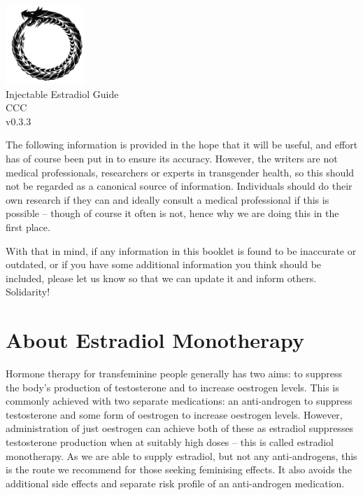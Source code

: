 \documentclass[twoside,a5paper]{article}
\begin{document}
\begin{titlepage}
  \null\vspace{2em}
  \setcounter{page}{0}
  \begin{center}
    \includegraphics[width=8em]{ouroboros} \\
    \vspace{3em}
    {\LARGE Injectable Estradiol Guide \\}
    \vspace{2em}
    {\large CCC \\}
    \vspace{0.6em}
    {\large v0.3.3 \\}
  \end{center}
\end{titlepage}

\setcounter{page}{1}
\clearpage
\hfill
\clearpage

\tableofcontents
\listoftables
\listoffigures

\newpage
{}

\noindent The following information is provided in the hope that it
will be useful, and effort has of course been put in to ensure its
accuracy.  However, the writers are not medical professionals,
researchers or experts in transgender health, so this should not be
regarded as a canonical source of information.  Individuals should do
their own research if they can and ideally consult a medical
professional if this is possible -- though of course it often is not,
hence why we are doing this in the first place.

With that in mind, if any information in this booklet is found to be
inaccurate or outdated, or if you have some additional information
you think should be included, please let us know so that we can update
it and inform others.  Solidarity!

\section{About Estradiol Monotherapy}

Hormone therapy for transfeminine people generally has two aims: to
suppress the body's production of testosterone and to increase
oestrogen levels.  This is commonly achieved with two separate
medications: an anti-androgen to suppress testosterone and some form
of oestrogen to increase oestrogen levels.  However, administration of
just oestrogen can achieve both of these as estradiol suppresses
testosterone production when at suitably high doses -- this is called
estradiol monotherapy.  As we are able to supply estradiol, but not
any anti-androgens, this is the route we recommend for those seeking
feminising effects.  It also avoids the additional side effects and
separate risk profile of an anti-androgen medication.
\end{document}
